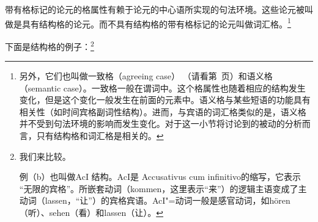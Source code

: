带有格标记的论元的格属性有赖于论元的中心语所实现的句法环境。这些论元被叫做是具有结构格的论元。而不具有结构格的带有格标记的论元叫做词汇格。\footnote{%
另外，它们也叫做一致格（agreeing case） （请看第~\pageref{page-Kasuskongruenz}页）和语义格（semantic case）。一致格一般在谓词中。这个格属性也随着相应的结构发生变化，但是这个变化一般发生在前面的元素中。语义格与某些短语的功能具有相关性（如时间宾格副词性结构）。进而，与宾语的词汇格类似的是，语义格并不受到句法环境的影响而发生变化。对于这一小节将讨论到的被动的分析而言，只有结构格和词汇格是相关的。
}

下面是结构格的例子：\footnote{
我们来比较。

例（b）也叫做AcI 结构。AcI是 Accusativus cum infinitivo的缩写，它表示 “无限的宾格”。所嵌套动词（kommen，这里表示“来”）的逻辑主语变成了主动词（lassen，“让”）的宾格宾语。AcI"=动词一般是感官动词，如hören（听）、sehen（看）和lassen（让）。
}

